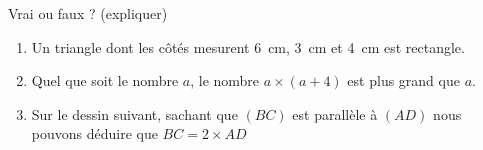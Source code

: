 
\begin{exercice}\label{exo2smath-0154}

    Vrai ou faux ? (expliquer)
    \begin{enumerate}
        \item
            Un triangle dont les côtés mesurent \SI{6}{\centi\meter}, \SI{3}{\centi\meter} et \SI{4}{\centi\meter} est rectangle.
        \item
            Quel que soit le nombre \( a\), le nombre \( a\times (a+4)\) est plus grand que \( a\).
        \item
            Sur le dessin suivant, sachant que \( (BC)\) est parallèle à \( (AD)\) nous pouvons déduire que \( BC=2\times AD\) 
            \begin{center}
                
            \end{center}

    \end{enumerate}

\end{exercice}
